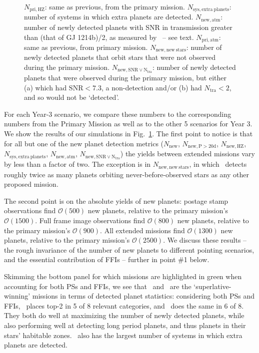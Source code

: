 \begin{figure}[!t]
{	$N_\mathrm{pri,HZ}$: same as previous, from the primary mission.
	$N_\mathrm{sys,extra\ planets}$: number of systems in which extra planets are detected.
	$N_\mathrm{new,atm}$: number of newly detected planets with SNR in transmission greater than (that of GJ 1214b)/2, as measured by \jwst\ -- see text.
	$N_\mathrm{pri,atm}$: same as previous, from primary mission.
	$N_\mathrm{new,new\ stars}$: number of newly detected planets that orbit stars that were not observed during the primary mission.
	$N_\mathrm{new,SNR\lor N_{tra}}$: number of newly detected planets that were observed during the primary mission, but either (a) which had $\mathrm{SNR}<7.3$, a non-detection and/or (b) had $N_\mathrm{tra}<2$, and so would not be `detected'.}
	\label{fig:yield_results}
\end{figure}

For each Year-3 scenario, we compare these numbers to the
corresponding numbers from the Primary Mission as well as to the other
5 scenarios for Year 3. We show the results of our simulations in
Fig.~\ref{fig:yield_results}.  The first point to notice is that for
all but one of the new planet detection metrics ($N_\mathrm{new}$,
$N_\mathrm{new,P>20d}$, $N_\mathrm{new,HZ}$,
$N_\mathrm{sys,extra\ planets}$, $N_\mathrm{new,atm}$,
$N_\mathrm{new,SNR\lor N_{tra}}$) the yields between extended missions
vary by less than a factor of two.  The exception is in
$N_\mathrm{new,new\ stars}$, in which \elong\ detects roughly twice as
many planets orbiting never-before-observed stars as any other
proposed mission.

The second point is on the absolute yields of new planets: postage stamp observations find $\mathcal{O}(500)$ new planets, relative to the primary mission's $\mathcal{O}(1500)$.
Full frame image observations find $\mathcal{O}(800)$ new planets, relative to the primary mission's $\mathcal{O}(900)$.
All extended missions find $\mathcal{O}(1300)$ new planets, relative to the primary mission's $\mathcal{O}(2500)$.
We discuss these results -- the rough invariance of the number of new planets to different pointing scenarios, and the essential contribution of FFIs -- further in point \#1 below.

Skimming the bottom panel for which missions are highlighted in green when accounting for both PSs and FFIs, we see that \npole\ and \hemis\ are the `superlative-winning' missions in terms of detected planet statistics: considering both PSs and FFIs, \npole\ places top-2 in 5 of 8 relevant categories, and \hemis\ does the same in 6 of 8.
They both do well at maximizing the number of newly detected planets, while also performing well at detecting long period planets, and thus planets in their stars' habitable zones.
\hemis\ also has the largest number of systems in which extra planets are detected.

